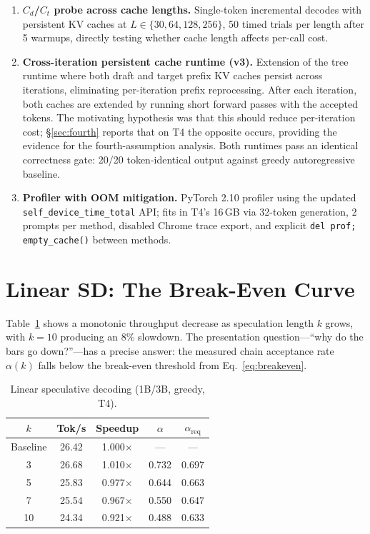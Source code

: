 \documentclass[letterpaper,twocolumn,10pt]{article}
\begin{document}
\begin{enumerate}
\item \textbf{$C_d$/$C_t$ probe across cache lengths.}
Single-token incremental decodes with persistent KV caches at $L \in \{30, 64, 128, 256\}$, 50 timed trials per length after 5 warmups, directly testing whether cache length affects per-call cost.

\item \textbf{Cross-iteration persistent cache runtime (v3).}
Extension of the tree runtime where both draft and target prefix KV caches persist across iterations, eliminating per-iteration prefix reprocessing.
After each iteration, both caches are extended by running short forward passes with the accepted tokens.
The motivating hypothesis was that this should reduce per-iteration cost; \S\ref{sec:fourth} reports that on T4 the opposite occurs, providing the evidence for the fourth-assumption analysis.
Both runtimes pass an identical correctness gate: 20/20 token-identical output against greedy autoregressive baseline.

\item \textbf{Profiler with OOM mitigation.}
PyTorch 2.10 profiler using the updated \texttt{self\_device\_time\_total} API; fits in T4's 16\,GB via 32-token generation, 2 prompts per method, disabled Chrome trace export, and explicit \texttt{del prof; empty\_cache()} between methods.
\end{enumerate}


\section{Linear SD: The Break-Even Curve}
\label{sec:linear}

Table~\ref{tab:linear_results} shows a monotonic throughput decrease as speculation length $k$ grows, with $k{=}10$ producing an 8\% slowdown.
The presentation question---``why do the bars go down?''---has a precise answer: the measured chain acceptance rate $\alpha(k)$ falls below the break-even threshold from Eq.~\ref{eq:breakeven}.

\begin{table}[t]
\centering
\small
\caption{Linear speculative decoding (1B/3B, greedy, T4).}
\label{tab:linear_results}
\smallskip
\begin{tabular}{@{}ccccc@{}}
\toprule
$k$ & Tok/s & Speedup & $\alpha$ & $\alpha_{\text{req}}$ \\
\midrule
Baseline & 26.42 & 1.000$\times$ & --- & --- \\
3        & 26.68 & 1.010$\times$ & 0.732 & 0.697 \\
5        & 25.83 & 0.977$\times$ & 0.644 & 0.663 \\
7        & 25.54 & 0.967$\times$ & 0.550 & 0.647 \\
10       & 24.34 & 0.921$\times$ & 0.488 & 0.633 \\
\bottomrule
\end{tabular}
\end{table}
\end{document}
